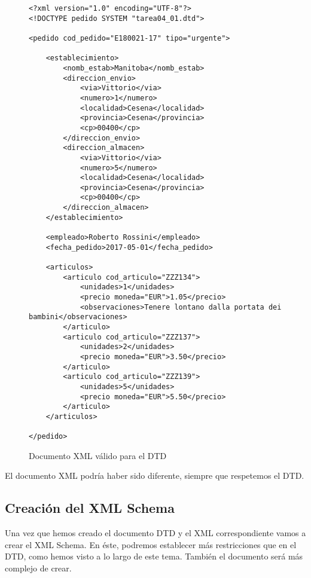 \begin{figure}[h]
    \begin{tcolorbox}[sharp corners, colback=yellow!30, colframe=white!20]
        \scriptsize
        \begin{verbatim}
<?xml version="1.0" encoding="UTF-8"?>
<!DOCTYPE pedido SYSTEM "tarea04_01.dtd">

<pedido cod_pedido="E180021-17" tipo="urgente">

    <establecimiento>
        <nomb_estab>Manitoba</nomb_estab>
        <direccion_envio>
            <via>Vittorio</via>
            <numero>1</numero>
            <localidad>Cesena</localidad>
            <provincia>Cesena</provincia>
            <cp>00400</cp>
        </direccion_envio>
        <direccion_almacen>
            <via>Vittorio</via>
            <numero>5</numero>
            <localidad>Cesena</localidad>
            <provincia>Cesena</provincia>
            <cp>00400</cp>
        </direccion_almacen>
    </establecimiento>

    <empleado>Roberto Rossini</empleado>
    <fecha_pedido>2017-05-01</fecha_pedido>

    <articulos>
        <articulo cod_articulo="ZZZ134">
            <unidades>1</unidades>
            <precio moneda="EUR">1.05</precio>
            <observaciones>Tenere lontano dalla portata dei bambini</observaciones>
        </articulo>
        <articulo cod_articulo="ZZZ137">
            <unidades>2</unidades>
            <precio moneda="EUR">3.50</precio>
        </articulo>
        <articulo cod_articulo="ZZZ139">
            <unidades>5</unidades>
            <precio moneda="EUR">5.50</precio>
        </articulo>
    </articulos>

</pedido>
        \end{verbatim}
    \end{tcolorbox}
    \caption{Documento XML válido para el DTD}
\end{figure}

El documento XML podría haber sido diferente, siempre que respetemos el DTD.

\subsection{Creación del XML Schema}
Una vez que hemos creado el documento DTD y el XML correspondiente vamos a crear el XML Schema. En éste, podremos establecer más restricciones que en el DTD, como hemos visto a lo largo de este tema. También el documento será más complejo de crear.

